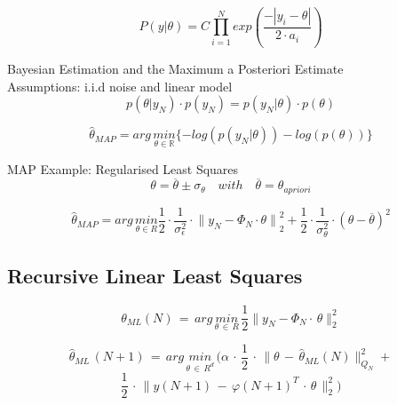 \begin{equation*}
{ P(y|\theta ) }=C\prod _{ i=1 }^{ N }{ { exp }(\frac { -|{ y }_{ i }-\theta | }{ 2\cdot { a }_{ i } } ) } 
\end{equation*} 

Bayesian Estimation and the Maximum a Posteriori Estimate\\
Assumptions: i.i.d noise and linear model
\begin{equation*}
p(\theta |{ y }_{ N })\cdot p({ y }_{ N })=p({ y }_{ N }|\theta )\cdot p(\theta)
\end{equation*}

\begin{equation*}
{ \hat{\theta} }_{ MAP } = arg \, \underset { \theta \in \mathbb{R} }{ min } \{-log(p({ y }_{ N }|\theta))-log(p(\theta))\}
\end{equation*}

MAP Example: Regularised Least Squares
\begin{equation*}
\theta =\overline { \theta  } \pm { \sigma  }_{ \theta  }\quad with \quad \overline { \theta  } = { \theta  }_{ apriori  }
\end{equation*}

\begin{equation*}
{ \hat { \theta  }  }_{ MAP }=arg\, \underset { \theta \in { R } }{ min } \frac { 1 }{ 2 } \cdot \frac { 1 }{ { \sigma  }_{ \epsilon  }^{ 2 } } \cdot { \parallel { y }_{ N }-{ \Phi  }_{ N }\cdot \theta \parallel  }_{ 2 }^{ 2 }+\frac { 1 }{ 2 } \cdot \frac { 1 }{ { \sigma  }_{ \theta  }^{ 2 } } \cdot { (\theta -  \overline{\theta}) }^{ 2 }
\end{equation*}

\subsection*{Recursive Linear Least Squares}
\begin{equation*}
\theta _{ ML }(N) \, = \, arg\, \underset { \theta \, \in \, { R } }{ min } \, \frac { 1 }{ 2 } \parallel y_N - \Phi_N\cdot\,\theta{ \parallel  }_{ 2 }^{ 2 }
\end{equation*}

\begin{equation*}
\hat { \theta  } _{ ML }\, (N+1)\, =\, arg\, \underset { \theta \, \in \, { R^{ d } } }{ min } \, (\alpha \, \cdot \, \frac { 1 }{ 2 } \, \cdot \, \parallel \theta \, - \, \hat { \theta  } _{ ML }(N){ \parallel  }_{ Q_{ N } }^{ 2 }+
\end{equation*}
\begin{equation*}
\frac { 1 }{ 2 } \, \cdot \, \parallel y(N+1) \, - \, \varphi (N+1)^{ T }\, \cdot \, \theta \, { \parallel  }_{ 2 }^{ 2 })
\end{equation*}

